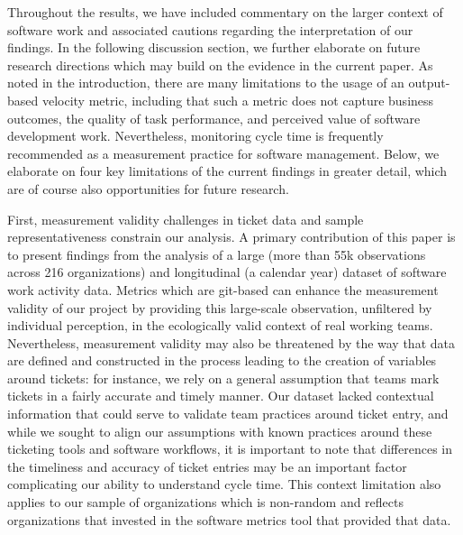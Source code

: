 \documentclass[
  sn-mathphys-ay,
]{sn-jnl}
\begin{document}
Throughout the results, we have included commentary on the larger
context of software work and associated cautions regarding the
interpretation of our findings. In the following discussion section, we
further elaborate on future research directions which may build on the
evidence in the current paper. As noted in the introduction, there are
many limitations to the usage of an output-based velocity metric,
including that such a metric does not capture business outcomes, the
quality of task performance, and perceived value of software development
work. Nevertheless, monitoring cycle time is frequently recommended as a
measurement practice for software management. Below, we elaborate on
four key limitations of the current findings in greater detail, which
are of course also opportunities for future research.

First, measurement validity challenges in ticket data and sample
representativeness constrain our analysis. A primary contribution of
this paper is to present findings from the analysis of a large (more
than 55k observations across 216 organizations) and longitudinal (a
calendar year) dataset of software work activity data. Metrics which are
git-based can enhance the measurement validity of our project by
providing this large-scale observation, unfiltered by individual
perception, in the ecologically valid context of real working teams.
Nevertheless, measurement validity may also be threatened by the way
that data are defined and constructed in the process leading to the
creation of variables around tickets: for instance, we rely on a general
assumption that teams mark tickets in a fairly accurate and timely
manner. Our dataset lacked contextual information that could serve to
validate team practices around ticket entry, and while we sought to
align our assumptions with known practices around these ticketing tools
and software workflows, it is important to note that differences in the
timeliness and accuracy of ticket entries may be an important factor
complicating our ability to understand cycle time. This context
limitation also applies to our sample of organizations which is
non-random and reflects organizations that invested in the software
metrics tool that provided that data.
\end{document}
